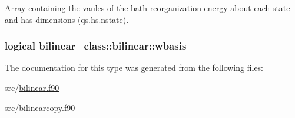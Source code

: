 Array containing the vaules of the bath reorganization energy about each state and has dimensions (qs.\+hs.\+nstate). 

\hypertarget{structbilinear__class_1_1bilinear_a78eec2ff8a3e1de38eb02ceeb108ad15}{
\subsubsection[{wbasis}]{\setlength{\rightskip}{0pt plus 5cm}logical bilinear\+\_\+class\+::bilinear\+::wbasis\hspace{0.3cm}{\ttfamily [private]}}}\label{structbilinear__class_1_1bilinear_a78eec2ff8a3e1de38eb02ceeb108ad15}


The documentation for this type was generated from the following files\+:\begin{DoxyCompactItemize}
\item 
src/\hyperlink{bilinear_8f90}{bilinear.\+f90}\item 
src/\hyperlink{bilinearcopy_8f90}{bilinearcopy.\+f90}\end{DoxyCompactItemize}
